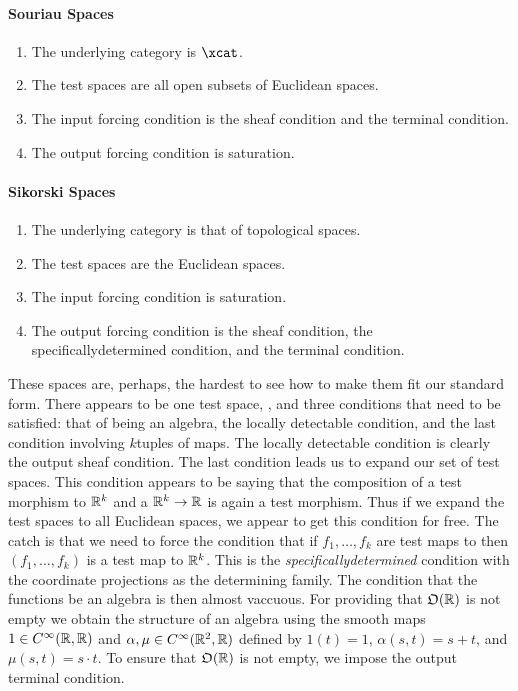 \documentclass[%
12pt,%
arxiv,%
defaults
]{myclass}
\begin{document}
\paragraph{Souriau Spaces}

\begin{enumerate}
\item The underlying category is \(\xcat\).
\item The test spaces are all open subsets of Euclidean spaces.
\item The input forcing condition is the sheaf condition and the terminal condition.
\item The output forcing condition is saturation.
\end{enumerate}

\paragraph{Sikorski Spaces}

\begin{enumerate}
\item The underlying category is that of topological spaces.
\item The test spaces are the Euclidean spaces.
\item The input forcing condition is saturation.
\item The output forcing condition is the sheaf condition, the specifically\enhyp{}determined condition, and the terminal condition.
\end{enumerate}

These spaces are, perhaps, the hardest to see how to make them fit our standard form.
There appears to be one test space, \R, and three conditions that need to be satisfied: that of being an algebra, the locally detectable condition, and the last condition involving \(k\)\enhyp{}tuples of maps.
The locally detectable condition is clearly the output sheaf condition.
The last condition leads us to expand our set of test spaces.
This condition appears to be saying that the composition of a test morphism to \(\mathbb{R}^k\) and a \cimap \(\mathbb{R}^k \to \mathbb{R}\) is again a test morphism.
Thus if we expand the test spaces to all Euclidean spaces, we appear to get this condition for free.
The catch is that we need to force the condition that if \(f_1, \dotsc, f_k\) are test maps to \R then \((f_1, \dotsc, f_k)\) is a test map to \(\mathbb{R}^k\).
This is the \emph{specifically\enhyp{}determined} condition with the coordinate projections as the determining family.
The condition that the functions be an algebra is then almost vaccuous.
For providing that \(\otest(\R)\) is not empty we obtain the structure of an algebra using the smooth maps \(1 \in C^\infty(\mathbb{R},\mathbb{R})\) and \(\alpha, \mu \in C^\infty(\mathbb{R}^2, \mathbb{R})\) defined by \(1(t) = 1\), \(\alpha(s,t) = s + t\), and \(\mu(s,t) = s \cdot t\).
To ensure that \(\otest(\R)\) is not empty, we impose the output terminal condition.
\end{document}

